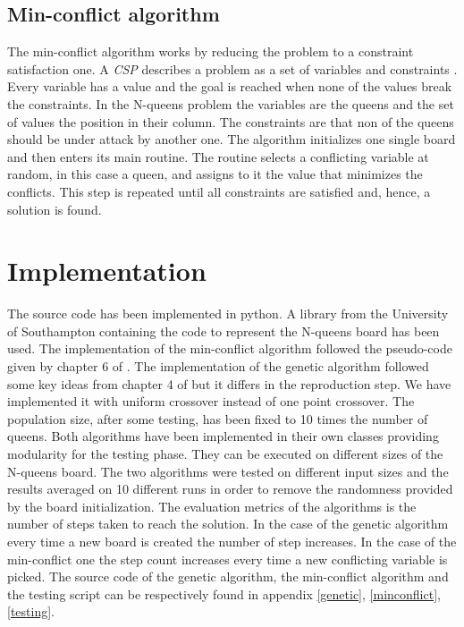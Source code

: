\documentclass[runningheads]{llncs}
\begin{document}
\subsection{Min-conflict algorithm}
The min-conflict algorithm works by reducing the problem to a
constraint satisfaction one. A \textit{CSP} describes a problem as a
set of variables and constraints \cite{russel2016artificial}. Every
variable has a value and the goal is reached when none of the values
break the constraints. In the N-queens problem the variables are the queens and
the set of values the position in their column. The constraints are
that non of the queens should be under attack by another one. The
algorithm initializes one single board and then enters its main
routine. The routine selects a conflicting variable at random, in this
case a queen, and assigns to it the value that minimizes the
conflicts. This step is repeated until all constraints are satisfied
and, hence, a solution is found.

\section{Implementation}
The source code has been implemented in python. A library from the
University of Southampton containing the code to represent the
N-queens board has been used. The implementation of the min-conflict
algorithm followed the pseudo-code given by chapter 6 of
\cite{russel2016artificial}. The implementation of the genetic
algorithm followed some key ideas from chapter 4 of
\cite{russel2016artificial} but it differs in the reproduction
step. We have implemented it with uniform crossover instead of one
point crossover. The population size, after some testing, has been
fixed to 10 times the number of queens. Both algorithms have been
implemented in their own classes providing modularity for the testing
phase. They can be executed on different sizes of the N-queens
board. The two algorithms were tested on different input sizes and the
results averaged on 10 different runs in order to remove the
randomness provided by the board initialization. The evaluation
metrics of the algorithms is the number of steps taken to reach the
solution. In the case of the genetic algorithm every time a new board
is created the number of step increases. In the case of the
min-conflict one the step count increases every time a new conflicting
variable is picked. The source code of the genetic algorithm, the
min-conflict algorithm and the testing script can be respectively found in appendix
\ref{genetic}, \ref{minconflict}, \ref{testing}.
\end{document}
